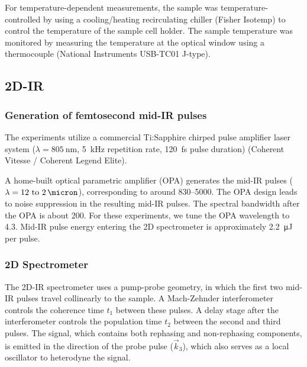 \documentclass[%
  class = book,%
  crop = false,%
  float = true,%
  multi = true,%
  preview = false,%
]{standalone}
\begin{document}
{For temperature-dependent measurements, the sample was temperature-controlled by using a cooling/heating recirculating chiller (Fisher Isotemp) to control the temperature of the sample cell holder. The sample temperature was monitored by measuring the temperature at the optical window using a thermocouple (National Instruments USB-TC01 J-type).

\subsection{2D-IR}
\label{sec:anions_methods_tdir}

\subsubsection{Generation of femtosecond mid-IR pulses}
\label{sec:anions_methods_tdir_generation}

The experiments utilize a commercial Ti:Sapphire chirped pulse amplifier laser system (\(\lambda = \SI{805}{\nm}\), \SI{5}{\kilo\hertz} repetition rate, \SI{120}{\fs} pulse duration) (Coherent Vitesse / Coherent Legend Elite).

A home-built optical parametric amplifier (OPA) generates the mid-IR pulses (\(\lambda = \SIrange{12}{2}{\micron}\)), corresponding to around \SIrange{830}{5000}{\wavenumber}. The OPA design leads to noise suppression in the resulting mid-IR pulses.\cite{Hamm2000} The spectral bandwidth after the OPA is about \SI{200}{\wavenumber}. For these experiments, we tune the OPA wavelength to \SI{4.3}{\micron}. Mid-IR pulse energy entering the 2D spectrometer is approximately \SI{2.2}{\micro\joule} per pulse.

\subsubsection{2D Spectrometer}
\label{sec:anions_methods_tdir_spectrometer}

The 2D-IR spectrometer uses a pump-probe geometry,\cite{Helbing2010} in which the first two mid-IR pulses travel collinearly to the sample. A Mach-Zehnder interferometer controls the coherence time \(t_1\) between these pulses. A delay stage after the interferometer controls the population time \(t_2\) between the second and third pulses. The signal, which contains both rephasing and non-rephasing components, is emitted in the direction of the probe pulse (\(\vec{k}_3\)), which also serves as a local oscillator to heterodyne the signal.

}
\end{document}
